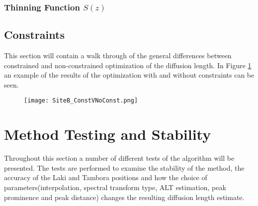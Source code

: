 \documentclass[../../CompleteThesis2/Complete_2ndDraft]{subfiles}
\begin{document}
\subsubsection{Thinning Function $S(z)$}
\label{Subsubsec:Method_SigmaMethod_SigmaCorrections_ThinningFct}



\subsection[Constraints][Constraints]{Constraints}
\label{Subsec:Method_SigmaMethod_Constraints}
This section will contain a walk through of the general differences between constrained and non-constrained optimization of the diffusion length. In Figure \ref{fig:SiteB_ConstVNoConst} an example of the results of the optimization with and without constraints can be seen.
\begin{figure}[h]
	\centering
	\texttt{[image: SiteB\_ConstVNoConst.png]}
	\caption[]{\footnotesize }
	\label{fig:SiteB_ConstVNoConst}
\end{figure}





\section[Testing and Stability][Testing and Stability]{Method Testing and Stability}
\label{Sec:Method_TestStab}

Throughout this section a number of different tests of the algorithm will be presented. The tests are performed to examine the stability of the method, the accuracy of the Laki and Tambora positions and how the choice of parameters(interpolation, spectral transform type, ALT estimation, peak prominence and peak distance) changes the resulting diffusion length estimate. 
\end{document}
